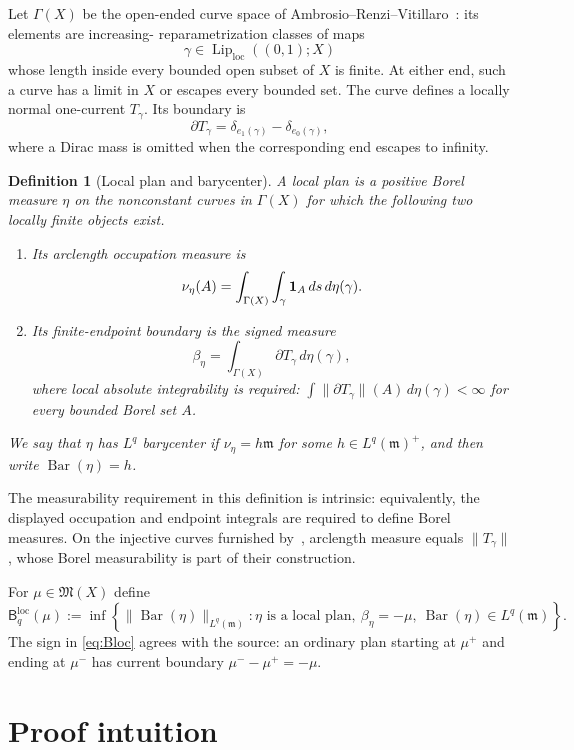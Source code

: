 \documentclass[11pt]{article}
\newtheorem{definition}[theorem]{Definition}
\newcommand{\X}{X}
\newcommand{\m}{\mathfrak m}
\newcommand{\Lip}{\operatorname{Lip}}
\newcommand{\PlanBar}{\operatorname{Bar}}
\begin{document}
Let $\Gamma(\X)$ be the open-ended curve space of
Ambrosio--Renzi--Vitillaro~\cite{ARV}: its elements are increasing-
reparametrization classes of maps
\[
 \gamma\in\Lip_{\mathrm{loc}}((0,1);\X)
\]
whose length inside every bounded open subset of $\X$ is finite.  At either
end, such a curve has a limit in $\X$ or escapes every bounded set.  The curve
defines a locally normal one-current $T_\gamma$.  Its boundary is
\[
 \partial T_\gamma=\delta_{e_1(\gamma)}-\delta_{e_0(\gamma)},
 \tag{2.1}\label{eq:curve-boundary}
\]
where a Dirac mass is omitted when the corresponding end escapes to infinity.

\begin{definition}[Local plan and barycenter]
A \emph{local plan} is a positive Borel measure $\eta$ on the nonconstant
curves in $\Gamma(\X)$ for
which the following two locally finite objects exist.
\begin{enumerate}[label=(\roman*)]
\item Its arclength occupation measure is
\[
 \nu_\eta(A)=\int_{\Gamma(\X)}\int_\gamma {\bf1}_A\,ds\,d\eta(\gamma).
\]
\item Its finite-endpoint boundary is the signed measure
\[
 \beta_\eta=\int_{\Gamma(\X)}\partial T_\gamma\,d\eta(\gamma),
 \tag{2.2}\label{eq:plan-boundary}
\]
where local absolute integrability is required:
$\int\|\partial T_\gamma\|(A)\,d\eta(\gamma)<\infty$ for every bounded
Borel set $A$.
\end{enumerate}
We say that $\eta$ has $L^q$ barycenter if
$\nu_\eta=h\m$ for some $h\in L^q(\m)^+$, and then write
$\PlanBar(\eta)=h$.
\end{definition}

The measurability requirement in this definition is intrinsic: equivalently,
the displayed occupation and endpoint integrals are required to define Borel
measures.  On the injective curves furnished by~\cite{ARV}, arclength measure
equals $\|T_\gamma\|$, whose Borel measurability is part of their construction.

For $\mu\in\mathfrak M(\X)$ define
\[
 \mathsf B_q^{\mathrm{loc}}(\mu)
 :=\inf\left\{\|\PlanBar(\eta)\|_{L^q(\m)}:
 \eta\text{ is a local plan},\ \beta_\eta=-\mu,\
 \PlanBar(\eta)\in L^q(\m)\right\}.
 \tag{2.3}\label{eq:Bloc}
\]
The sign in \eqref{eq:Bloc} agrees with the source: an ordinary plan starting
at $\mu^+$ and ending at $\mu^-$ has current boundary
$\mu^--\mu^+=-\mu$.

\section{Proof intuition}
\end{document}
